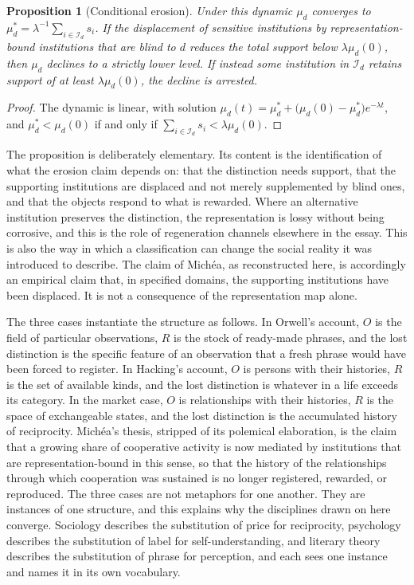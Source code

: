 \documentclass[12pt]{article}
\newtheorem{proposition}{Proposition}[section]
\begin{document}
\begin{proposition}[Conditional erosion]\label{prop:erosion}
Under this dynamic $\mu_d$ converges to $\mu_d^{*}=\lambda^{-1}\sum_{i\in\mathcal I_d}s_i$. If the displacement of sensitive institutions by representation-bound institutions that are blind to $d$ reduces the total support below $\lambda\mu_d(0)$, then $\mu_d$ declines to a strictly lower level. If instead some institution in $\mathcal I_d$ retains support of at least $\lambda\mu_d(0)$, the decline is arrested.
\end{proposition}

\begin{proof}
The dynamic is linear, with solution $\mu_d(t)=\mu_d^{*}+\bigl(\mu_d(0)-\mu_d^{*}\bigr)e^{-\lambda t}$, and $\mu_d^{*}<\mu_d(0)$ if and only if $\sum_{i\in\mathcal I_d}s_i<\lambda\mu_d(0)$.
\end{proof}

The proposition is deliberately elementary. Its content is the identification of what the erosion claim depends on: that the distinction needs support, that the supporting institutions are displaced and not merely supplemented by blind ones, and that the objects respond to what is rewarded. Where an alternative institution preserves the distinction, the representation is lossy without being corrosive, and this is the role of regeneration channels elsewhere in the essay. This is also the way in which a classification can change the social reality it was introduced to describe. The claim of Michéa, as reconstructed here, is accordingly an empirical claim that, in specified domains, the supporting institutions have been displaced. It is not a consequence of the representation map alone.

The three cases instantiate the structure as follows. In Orwell's account, $O$ is the field of particular observations, $R$ is the stock of ready-made phrases, and the lost distinction is the specific feature of an observation that a fresh phrase would have been forced to register. In Hacking's account, $O$ is persons with their histories, $R$ is the set of available kinds, and the lost distinction is whatever in a life exceeds its category. In the market case, $O$ is relationships with their histories, $R$ is the space of exchangeable states, and the lost distinction is the accumulated history of reciprocity. Michéa's thesis, stripped of its polemical elaboration, is the claim that a growing share of cooperative activity is now mediated by institutions that are representation-bound in this sense, so that the history of the relationships through which cooperation was sustained is no longer registered, rewarded, or reproduced. The three cases are not metaphors for one another. They are instances of one structure, and this explains why the disciplines drawn on here converge. Sociology describes the substitution of price for reciprocity, psychology describes the substitution of label for self-understanding, and literary theory describes the substitution of phrase for perception, and each sees one instance and names it in its own vocabulary.
\end{document}
